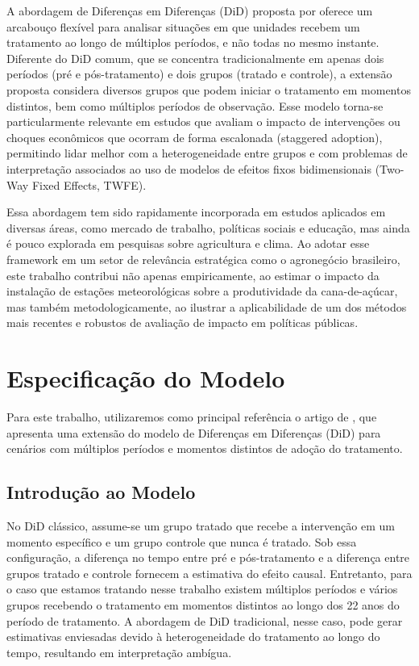 \documentclass[
	12pt,				%
	openright,			%
	oneside,			%
	a4paper,			%
	english,			%
	french,				%
	spanish,			%
	brazil				%
	]{abntex2}
\begin{document}
A abordagem de Diferenças em Diferenças (DiD) proposta por  oferece um arcabouço flexível para analisar situações em que unidades recebem um tratamento ao longo de múltiplos períodos, e não todas no mesmo instante. Diferente do DiD comum, que se concentra tradicionalmente em apenas dois períodos (pré e pós-tratamento) e dois grupos (tratado e controle), a extensão proposta considera diversos grupos que podem iniciar o tratamento em momentos distintos, bem como múltiplos períodos de observação. Esse modelo torna-se particularmente relevante em estudos que avaliam o impacto de intervenções ou choques econômicos que ocorram de forma escalonada (staggered adoption), permitindo lidar melhor com a heterogeneidade entre grupos e com problemas de interpretação associados ao uso de modelos de efeitos fixos bidimensionais (Two-Way Fixed Effects, TWFE).

Essa abordagem tem sido rapidamente incorporada em estudos aplicados em diversas áreas, como mercado de trabalho, políticas sociais e educação, mas ainda é pouco explorada em pesquisas sobre agricultura e clima. Ao adotar esse framework em um setor de relevância estratégica como o agronegócio brasileiro, este trabalho contribui não apenas empiricamente, ao estimar o impacto da instalação de estações meteorológicas sobre a produtividade da cana-de-açúcar, mas também metodologicamente, ao ilustrar a aplicabilidade de um dos métodos mais recentes e robustos de avaliação de impacto em políticas públicas.

\chapter{Especificação do Modelo}

Para este trabalho, utilizaremos como principal referência o artigo de , que apresenta uma extensão do modelo de Diferenças em Diferenças (DiD) para cenários com múltiplos períodos e momentos distintos de adoção do tratamento.

\section{Introdução ao Modelo}

No DiD clássico, assume-se um grupo tratado que recebe a intervenção em um momento específico e um grupo controle que nunca é tratado. Sob essa configuração, a diferença no tempo entre pré e pós-tratamento e a diferença entre grupos tratado e controle fornecem a estimativa do efeito causal. Entretanto, para o caso que estamos tratando nesse trabalho existem múltiplos períodos e vários grupos recebendo o tratamento em momentos distintos ao longo dos 22 anos do período de tratamento. A abordagem de DiD tradicional, nesse caso, pode gerar estimativas enviesadas devido à heterogeneidade do tratamento ao longo do tempo, resultando em interpretação ambígua.
\end{document}

